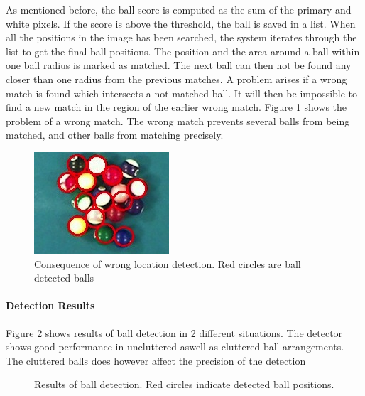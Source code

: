 As mentioned before, the ball score is computed as the sum of the primary and white pixels. If the score is above the threshold, the ball is saved in a list. When all the positions in the image has been searched, the system iterates through the list to get the final ball positions. The position and the area around  a ball within one ball radius is marked as matched. The next ball can then not be found any closer than one radius from the previous matches. A problem arises if a wrong match is found which intersects a not matched ball. It will then be impossible to find a new match in the region of the earlier wrong match. Figure \ref{fig:wronglocate} shows the problem of a wrong match. The wrong match prevents several balls from being matched, and other balls from matching precisely.\\

\begin{figure}[H]
\begin{center}
\includegraphics{images/wronglocate.jpg}
\caption{Consequence of wrong location detection. Red circles are ball detected balls}
\label{fig:wronglocate}
\end{center}
\end{figure}

\paragraph{Detection Results}
Figure \ref{fig:detect} shows results of ball detection in 2 different situations. The detector shows good performance in uncluttered aswell as cluttered ball arrangements. The cluttered balls does however affect the precision of the detection

\begin{figure}[H]
  \centering
  \quad           
   \caption{Results of ball detection. Red circles indicate detected ball positions.}
  \label{fig:detect}
\end{figure}

